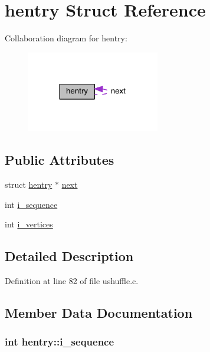 \hypertarget{structhentry}{\section{hentry Struct Reference}
\label{structhentry}
}


Collaboration diagram for hentry\+:
\nopagebreak
\begin{figure}[H]
\begin{center}
\leavevmode
\includegraphics[width=164pt]{structhentry__coll__graph}
\end{center}
\end{figure}
\subsection*{Public Attributes}
\begin{DoxyCompactItemize}
\item 
struct \hyperlink{structhentry}{hentry} $\ast$ \hyperlink{structhentry_a94f2927d851d194c036657b96aeb8a08}{next}
\item 
int \hyperlink{structhentry_a5411cfacc693173761cb14a6abe4e756}{i\+\_\+sequence}
\item 
int \hyperlink{structhentry_a72c714e369c96f7f198462dbc7a6e21d}{i\+\_\+vertices}
\end{DoxyCompactItemize}


\subsection{Detailed Description}


Definition at line 82 of file ushuffle.\+c.



\subsection{Member Data Documentation}
\hypertarget{structhentry_a5411cfacc693173761cb14a6abe4e756}{
\subsubsection[{i\+\_\+sequence}]{\setlength{\rightskip}{0pt plus 5cm}int hentry\+::i\+\_\+sequence}}\label{structhentry_a5411cfacc693173761cb14a6abe4e756}


